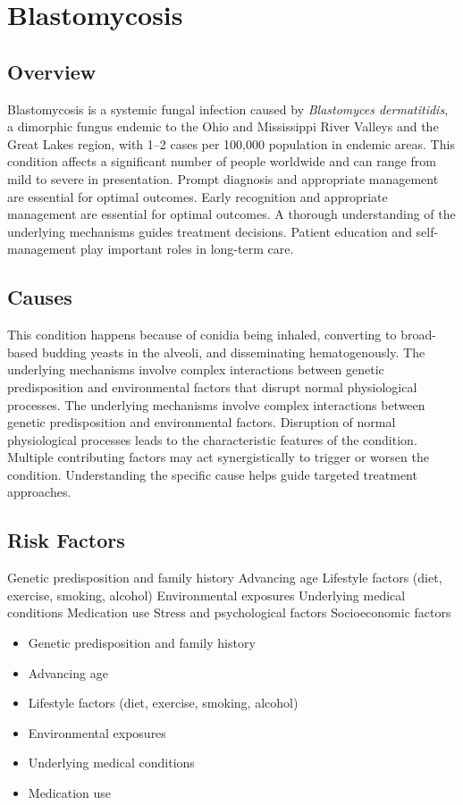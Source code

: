 \chapter{Blastomycosis}
\label{sec:Blastomycosis}

\section{Overview}
Blastomycosis is a systemic fungal infection caused by \textit{Blastomyces dermatitidis}, a dimorphic fungus endemic to the Ohio and Mississippi River Valleys and the Great Lakes region, with 1--2 cases per 100,000 population in endemic areas. This condition affects a significant number of people worldwide and can range from mild to severe in presentation. Prompt diagnosis and appropriate management are essential for optimal outcomes. Early recognition and appropriate management are essential for optimal outcomes. A thorough understanding of the underlying mechanisms guides treatment decisions. Patient education and self-management play important roles in long-term care.
\section{Causes}
This condition happens because of conidia being inhaled, converting to broad-based budding yeasts in the alveoli, and disseminating hematogenously. The underlying mechanisms involve complex interactions between genetic predisposition and environmental factors that disrupt normal physiological processes. The underlying mechanisms involve complex interactions between genetic predisposition and environmental factors. Disruption of normal physiological processes leads to the characteristic features of the condition. Multiple contributing factors may act synergistically to trigger or worsen the condition. Understanding the specific cause helps guide targeted treatment approaches.
\section{Risk Factors}
Genetic predisposition and family history Advancing age Lifestyle factors (diet, exercise, smoking, alcohol) Environmental exposures Underlying medical conditions Medication use Stress and psychological factors Socioeconomic factors

\begin{itemize}[noitemsep]
  \item Genetic predisposition and family history
  \item Advancing age
  \item Lifestyle factors (diet, exercise, smoking, alcohol)
  \item Environmental exposures
  \item Underlying medical conditions
  \item Medication use
\end{itemize}

